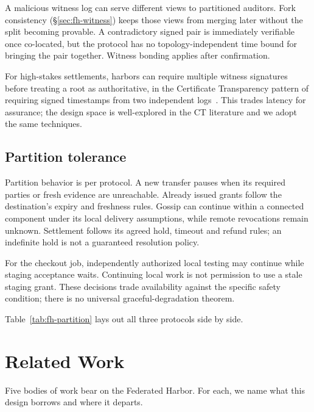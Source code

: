 \documentclass[11pt,a4paper]{article}
\theoremstyle{definition}
\theoremstyle{remark}
\begin{document}
\ifpdmargincolumn\pdequivocationsketch\fi
A malicious witness log can serve different views to partitioned auditors. Fork consistency (\S\ref{sec:fh-witness}) keeps those views from merging later without the split becoming provable. A contradictory signed pair is immediately verifiable once co-located, but the protocol has no topology-independent time bound for bringing the pair together. Witness bonding applies after confirmation.

For high-stakes settlements, harbors can require multiple witness signatures before treating a root as authoritative, in the Certificate Transparency pattern of requiring signed timestamps from two independent logs~. This trades latency for assurance; the design space is well-explored in the CT literature and we adopt the same techniques.

\subsection{Partition tolerance}\label{sec:fh-partition}

Partition behavior is per protocol. A new transfer pauses when its required
parties or fresh evidence are unreachable. Already issued grants follow the
destination's expiry and freshness rules. Gossip can continue within a
connected component under its local delivery assumptions, while remote
revocations remain unknown. Settlement follows its agreed hold, timeout and
refund rules; an indefinite hold is not a guaranteed resolution policy.

For the checkout job, independently authorized local testing may continue
while staging acceptance waits. Continuing local work is not permission to
use a stale staging grant. These decisions trade availability against the
specific safety condition; there is no universal graceful-degradation theorem.

Table~\ref{tab:fh-partition} lays out all three protocols side by side.



\section{Related Work}\label{sec:fh-related}

Five bodies of work bear on the Federated Harbor. For each, we name what this design borrows and where it departs.
\end{document}
